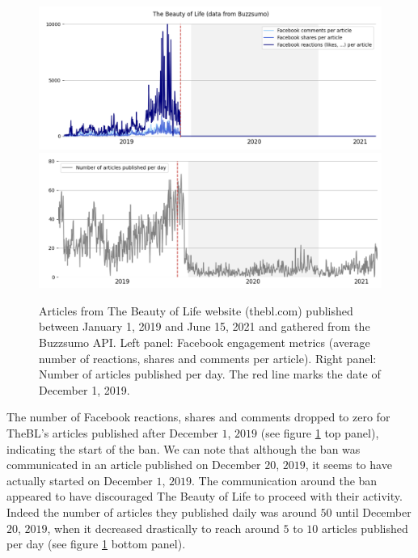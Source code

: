 \documentclass{article}
\begin{document}
\begin{figure}[h]
	\centering
	
		\includegraphics[scale=0.3]{./img/beautyoflife/fb_bl_1.png}
		\includegraphics[scale=0.3]{./img/beautyoflife/fb_bl_2.png} 
	
	\caption{Articles from The Beauty of Life website (thebl.com) published between January 1, 2019 and June 15, 2021 and gathered from the Buzzsumo API. Left panel: Facebook engagement metrics (average number of reactions, shares and comments per article). Right panel: Number of articles published per day. The red line marks the date of December 1, 2019. }
	\label{fb_bl}
\end{figure}

The number of Facebook reactions, shares and comments dropped to zero for TheBL’s articles published after December $1$, $2019$ (see figure \ref{fb_bl} top panel), indicating the start of the ban. We can note that although the ban was communicated in an article published on December $20$, $2019$, it seems to have actually started on December $1$, $2019$. The communication around the ban appeared to have discouraged The Beauty of Life to proceed with their activity. Indeed the number of articles they published daily was around $50$ until December $20$, $2019$, when it decreased drastically to reach around $5$ to $10$ articles published per day (see figure \ref{fb_bl} bottom panel). 
\end{document}

